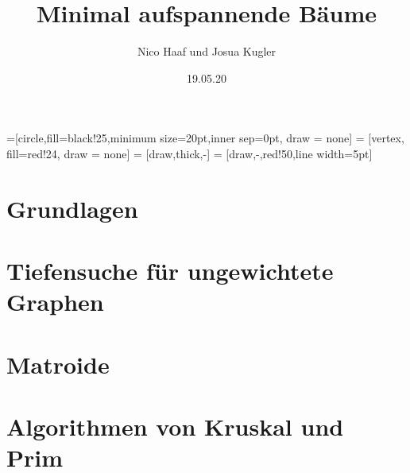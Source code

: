 \documentclass{beamer}
\author{Nico Haaf und Josua Kugler}
\title{Minimal auf\textbf{spannende} Bäume}
\date{19.05.20}
\theoremstyle{definition}
\begin{document}
=[circle,fill=black!25,minimum size=20pt,inner sep=0pt, draw = none]
 = [vertex, fill=red!24, draw = none]
 = [draw,thick,-]
 = [draw,-,red!50,line width=5pt]
\graphicspath{{images/}}
  \maketitle
  
\section*{Grundlagen}
  
  
  
  
  
  
  
  
  
\section*{Tiefensuche für ungewichtete Graphen}
  
  
  
\section*{Matroide}
  
  
  
  
  
\section*{Algorithmen von Kruskal und Prim}
  
  
  
  
  
  
  
  
	
  
\end{document}
